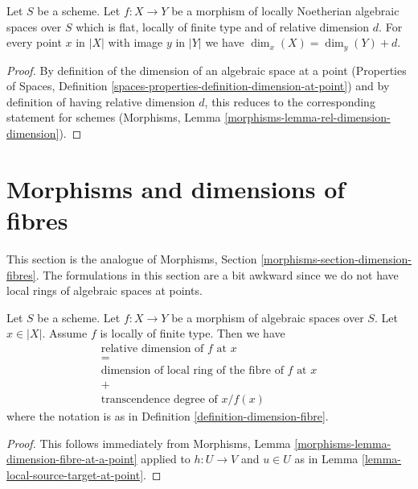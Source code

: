 \begin{lemma}
\label{lemma-rel-dimension-dimension}
Let $S$ be a scheme. Let $f : X \to Y$ be a morphism of locally Noetherian
algebraic spaces over $S$ which is flat, locally of finite type and of
relative dimension $d$. For every point $x$ in $|X|$ with image
$y$ in $|Y|$ we have $\dim_x(X) = \dim_y(Y) + d$.
\end{lemma}

\begin{proof}
By definition of the dimension of an algebraic space
at a point (Properties of Spaces, Definition
\ref{spaces-properties-definition-dimension-at-point})
and by definition of having relative dimension $d$,
this reduces to the corresponding statement for schemes
(Morphisms, Lemma \ref{morphisms-lemma-rel-dimension-dimension}).
\end{proof}







\section{Morphisms and dimensions of fibres}
\label{section-dimension-fibres}

\noindent
This section is the analogue of
Morphisms, Section \ref{morphisms-section-dimension-fibres}.
The formulations in this section are a bit awkward since
we do not have local rings of algebraic spaces at points.

\begin{lemma}
\label{lemma-dimension-fibre-at-a-point}
Let $S$ be a scheme.
Let $f : X \to Y$ be a morphism of algebraic spaces over $S$.
Let $x \in |X|$.
Assume $f$ is locally of finite type.
Then we have
$$
\begin{matrix}
\text{relative dimension of }f\text{ at }x \\
= \\
\text{dimension of local ring of the fibre of }f\text{ at }x \\
+ \\
\text{transcendence degree of }x/f(x)
\end{matrix}
$$
where the notation is as in
Definition \ref{definition-dimension-fibre}.
\end{lemma}

\begin{proof}
This follows immediately from
Morphisms, Lemma \ref{morphisms-lemma-dimension-fibre-at-a-point}
applied to $h : U \to V$ and $u \in U$
as in
Lemma \ref{lemma-local-source-target-at-point}.
\end{proof}

